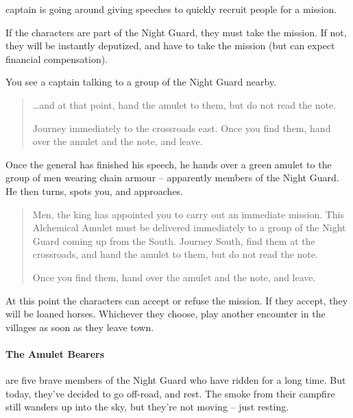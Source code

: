 \begin{multicols}{2}
\Gls{captain} is going around giving speeches to quickly recruit people for a mission.

If the characters are part of the Night Guard, they must take the mission.
If not, they will be instantly deputized, and have to take the mission (but can expect financial compensation).

\begin{boxtext}

	You see a \gls{captain} talking to a group of the Night Guard nearby.

	\begin{quotation}

		\ldots and at that point, hand the amulet to them, but do not read the note.

		Journey immediately to the crossroads east.
		Once you find them, hand over the amulet and the note, and leave.

	\end{quotation}

	Once the general has finished his speech, he hands over a green amulet to the group of men wearing chain armour -- apparently members of the Night Guard.
	He then turns, spots you, and approaches.

	\begin{quotation}

		Men, the king has appointed you to carry out an immediate mission.
		This Alchemical Amulet must be delivered immediately to a group of the Night Guard coming up from the South.
		Journey South, find them at the crossroads, and hand the amulet to them, but do not read the note.

		Once you find them, hand over the amulet and the note, and leave.

	\end{quotation}

\end{boxtext}

At this point the characters can accept or refuse the mission.  If they accept, they will be loaned horses.  Whichever they choose, play another encounter in the villages as soon as they leave town.

\paragraph{The Amulet Bearers} are five brave members of the Night Guard who have ridden for a long time.  But today, they've decided to go off-road, and rest.  The smoke from their campfire still wanders up into the sky, but they're not moving -- just resting.


\end{multicols}
